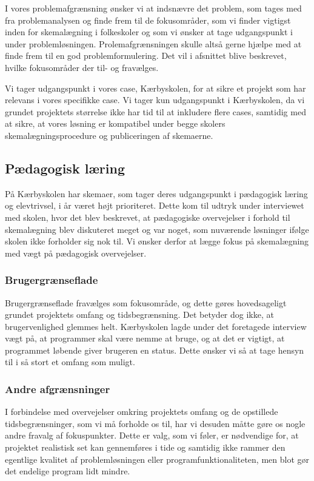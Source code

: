 \label{afg}
I vores problemafgrænsning ønsker vi at indsnævre det problem, som tages med fra problemanalysen og finde frem til de fokusområder, som vi finder vigtigst inden for skemalægning i folkeskoler og som vi ønsker at tage udgangspunkt i under problemløsningen. Prolemafgrænsningen skulle altså gerne hjælpe med at finde frem til en god problemformulering. Det vil i afsnittet blive beskrevet, hvilke fokusområder der til- og fravælges.

Vi tager udgangspunkt i vores case, Kærbyskolen, for at sikre et projekt som har relevans i vores specifikke case. Vi tager kun udgangspunkt i Kærbyskolen, da vi grundet projektets størrelse ikke har tid til at inkludere flere cases, samtidig med at sikre, at vores løsning er kompatibel under begge skolers skemalægningsprocedure og publiceringen af skemaerne. 

\subsection*{Pædagogisk læring}
På Kærbyskolen har skemaer, som tager deres udgangspunkt i pædagogisk læring og elevtrivsel, i år været højt prioriteret. Dette kom til udtryk under interviewet med skolen, hvor det blev beskrevet, at pædagogiske overvejelser i forhold til skemalægning blev diskuteret meget og var noget, som nuværende løsninger ifølge skolen ikke forholder sig nok til. Vi ønsker derfor at lægge fokus på skemalægning med vægt på pædagogisk overvejelser.

\subsubsection*{Brugergrænseflade}
Brugergrænseflade fravælges som fokusområde, og dette gøres hovedsageligt grundet projektets omfang og tidsbegrænsning. Det betyder dog ikke, at brugervenlighed glemmes helt. Kærbyskolen lagde under det foretagede interview vægt på, at programmer skal være nemme at bruge, og at det er vigtigt, at programmet løbende giver brugeren en status. Dette ønsker vi så at tage hensyn til i så stort et omfang som muligt.

\subsubsection*{Andre afgrænsninger}
I forbindelse med overvejelser omkring projektets omfang og de opstillede tidsbegrænsninger, som vi må forholde os til, har vi desuden måtte gøre os nogle andre fravalg af fokuspunkter. Dette er valg, som vi føler, er nødvendige for, at projektet realistisk set kan gennemføres i tide og samtidig ikke rammer den egentlige kvalitet af problemløsningen eller programfunktionaliteten, men blot gør det endelige program lidt mindre.

